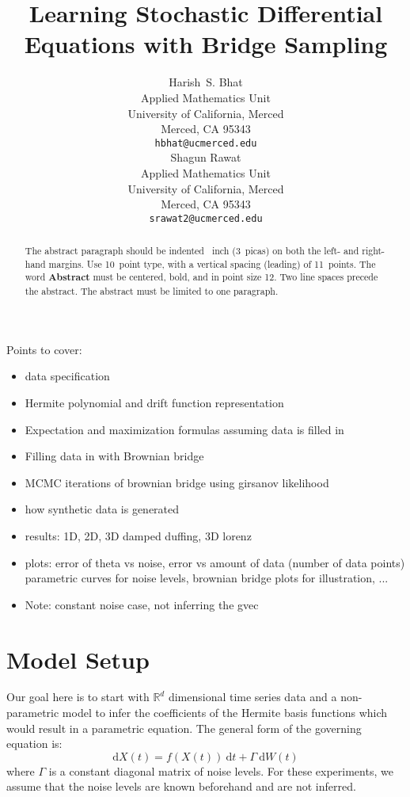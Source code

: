\documentclass{article}
\title{Learning Stochastic Differential Equations with Bridge Sampling}
\author{
 Harish~S. Bhat\\
 Applied Mathematics Unit\\
 University of California, Merced\\
 Merced, CA 95343\\
 \texttt{hbhat@ucmerced.edu} \\
 \And
 Shagun Rawat\\
 Applied Mathematics Unit\\
 University of California, Merced\\
 Merced, CA 95343\\
 \texttt{srawat2@ucmerced.edu}
}
\begin{document}
\maketitle

\begin{abstract}
  The abstract paragraph should be indented ~inch
  (3~picas) on both the left- and right-hand margins. Use 10~point
  type, with a vertical spacing (leading) of 11~points.  The word
  \textbf{Abstract} must be centered, bold, and in point size 12. Two
  line spaces precede the abstract. The abstract must be limited to
  one paragraph.
\end{abstract}


Points to cover:
\begin{itemize}
\item data specification
\item Hermite polynomial and drift function representation
\item Expectation and maximization formulas assuming data is filled in
\item Filling data in with Brownian bridge
\item MCMC iterations of brownian bridge using girsanov likelihood
\item how synthetic data is generated
\item results: 1D, 2D, 3D damped duffing, 3D lorenz
\item plots: error of theta vs noise, error vs amount of data (number of data points) parametric curves for noise levels, brownian bridge plots for illustration, ...
\item Note: constant noise case, not inferring the gvec
\end{itemize}

\section{Model Setup}
Our goal here is to start with $\mathbb{R}^{d}$ dimensional time series data and a non-parametric model to infer the coefficients  of the Hermite basis functions which would result in a parametric equation. The general form of the governing equation is:
\begin{equation}
\mathrm{d} X(t) = f(X(t)) \: \mathrm{d} t + \Gamma \: \mathrm{d} W(t)
\end{equation}
where $\Gamma$ is a constant diagonal matrix of noise levels. For these experiments, we assume that the noise levels are known beforehand and are not inferred.
\end{document}
